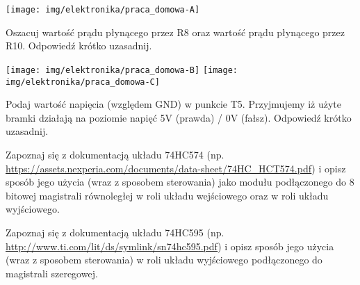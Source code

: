 \documentclass{pdfBooklets}
\begin{document}
\begin{center}
    \texttt{[image: img/elektronika/praca\_domowa-A]}
\end{center}

\begin{ZadanieDomowe} [2pkt]
Oszacuj wartość prądu płynącego przez R8 oraz wartość prądu płynącego przez R10. Odpowiedź krótko uzasadnij.
\end{ZadanieDomowe}

\begin{center}
    \texttt{[image: img/elektronika/praca\_domowa-B]}
    \hspace{0.05\textwidth}
    \texttt{[image: img/elektronika/praca\_domowa-C]}
\end{center}

\begin{ZadanieDomowe} [1pkt]
Podaj wartość napięcia (względem GND) w punkcie T5. Przyjmujemy iż użyte bramki działają na poziomie napięć 5V (prawda) / 0V (fałsz). Odpowiedź krótko uzasadnij.
\end{ZadanieDomowe}

\begin{ZadanieDomowe} [2pkt]
Zapoznaj się z dokumentacją układu 74HC574 (np. \url{https://assets.nexperia.com/documents/data-sheet/74HC_HCT574.pdf}) i opisz sposób jego użycia (wraz z sposobem sterowania) jako modułu podłączonego do 8 bitowej magistrali równoległej w roli układu wejściowego oraz w roli układu wyjściowego.
\end{ZadanieDomowe}

\begin{ZadanieDomowe} [2pkt]
Zapoznaj się z dokumentacją układu 74HC595 (np. \url{http://www.ti.com/lit/ds/symlink/sn74hc595.pdf}) i opisz sposób jego użycia (wraz z sposobem sterowania) w roli układu wyjściowego podłączonego do magistrali szeregowej.
\end{ZadanieDomowe}

\end{document}
